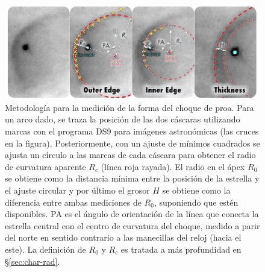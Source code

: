\begin{figure}
  \centering
  \includegraphics[width=\linewidth]{./Figures/radius-methodology-Luis}
  \caption[Metodología para la medición de la forma del choque de proa]{Metodología para la medición de la forma del choque de proa. Para un arco dado, se traza la posición de las dos cáscaras utilizando marcas con el programa DS9 para imágenes astronómicas (las cruces en la figura). Posteriormente, con un ajuste de mínimos cuadrados se ajusta un círculo a las marcas de cada cáscara para obtener el radio de curvatura aparente $R_c$ (línea roja rayada). El radio en el ápex $R_0$ se obtiene como la distancia mínima entre la posición de la estrella y el ajuste circular y por último el grosor $H$ se obtiene como la diferencia entre ambas mediciones de $R_0$, suponiendo que estén disponibles. PA es el ángulo de orientación de la línea que conecta la estrella central con el centro de curvatura del choque, medido a parir del norte en sentido contrario a las manecillas del reloj (hacia el este). La definición de $R_0$ y $R_c$ es tratada a más profundidad en \S \ref{sec:char-rad}.}
  \label{fig:methodology-LL}
\end{figure}

